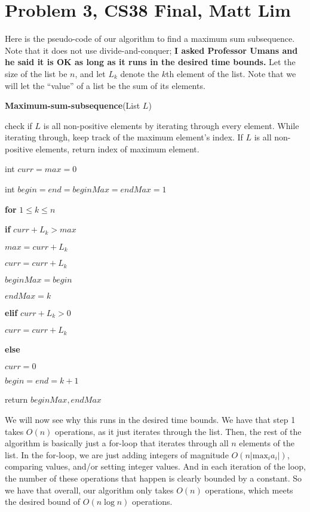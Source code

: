 \documentclass{article}
\begin{document}
\section*{Problem 3, CS38 Final, Matt Lim}
Here is the pseudo-code of our algorithm to find a maximum sum subsequence. Note
that it does not use divide-and-conquer; \textbf{I asked Professor Umans and he said it
is OK as long as it runs in the desired time bounds.} Let the size of the
list be $n$, and let $L_k$ denote the $k$th element of the list.
Note that we will let the ``value'' of a list be the sum of its elements.

\vspace{5mm}

\textbf{Maximum-sum-subsequence}(List $L$)
\begin{enumerate}
    \item check if $L$ is all non-positive elements by iterating through every
        element. While iterating through, keep track of the maximum element's index.
        If $L$ is all non-positive elements, return index of maximum element.
    \item int $curr = max = 0$
    \item int $begin = end = beginMax = endMax = 1$
    \item \textbf{for} $1 \leq k \leq n$
    {\setlength\itemindent{25pt} \item \textbf{if} $curr + L_k > max$ }
    {\setlength\itemindent{50pt} \item $max = curr + L_k$ }
    {\setlength\itemindent{50pt} \item $curr = curr + L_k$ }
    {\setlength\itemindent{50pt} \item $beginMax = begin$ }
    {\setlength\itemindent{50pt} \item $endMax = k$ }
    {\setlength\itemindent{25pt} \item \textbf{elif} $curr + L_k > 0$ }
    {\setlength\itemindent{50pt} \item $curr = curr + L_k$ }
    {\setlength\itemindent{25pt} \item \textbf{else} }
    {\setlength\itemindent{50pt} \item $curr = 0$ }
    {\setlength\itemindent{50pt} \item $begin = end = k+1$ }
    \item return $beginMax, endMax$
\end{enumerate}

\vspace{5mm}
We will now see why this runs in the desired time bounds. We have that step 1
takes $O(n)$ operations, as it just iterates through the list. Then, the rest of
the algorithm is basically just a for-loop that iterates through all $n$
elements of the list. In the for-loop, we are just adding integers of
magnitude $O(n|\text{max$_i a_i$}|)$, comparing values, and/or setting integer values.
And in each iteration of the loop, the number of these operations that happen is
clearly bounded by a constant. So we have that overall, our algorithm only takes
$O(n)$ operations, which meets the desired bound of $O(n\log n)$ operations.
\end{document}

